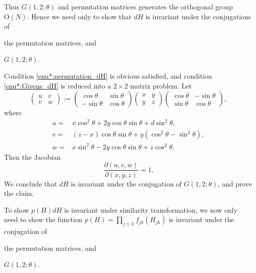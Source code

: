 \documentclass[11pt, a4paper]{article}
\numberwithin{equation}{section}
\newcommand{\Orthogonal}{\mathrm{O}}
\theoremstyle{definition}
\theoremstyle{remark}
\begin{document}
Thus $G(1, 2; \theta)$ and permutation matrices generates the orthogonal group $\Orthogonal(N)$. Hence we need only to show that $dH$ is invariant under the conjugations of
\begin{enumerate*}[label=(\alph*)]
\item \label{enu*:permutation_dH}
  the permutation matrices, and
\item \label{enu*:Givens_dH}
  $G(1, 2; \theta)$.
\end{enumerate*}
Condition \ref{enu*:permutation_dH} is obvious satisfied, and condition \ref{enu*:Givens_dH} is reduced into a $2 \times 2$ matrix problem. Let
\begin{equation}
  \begin{pmatrix}
    u & v \\
    v & w
  \end{pmatrix}
  :=
  \begin{pmatrix}
    \cos \theta & \sin \theta \\
    -\sin \theta & \cos \theta
  \end{pmatrix}
  \begin{pmatrix}
    x & y \\
    y & z
  \end{pmatrix}
  \begin{pmatrix}
    \cos \theta & -\sin \theta \\
    \sin \theta & \cos \theta
  \end{pmatrix},
  \end{equation}
where
\begin{align}
  u = {}& x \cos^2 \theta + 2y \cos \theta \sin \theta + d \sin^2 \theta, \label{eq:u_on_xyz} \\
  v = {}& (z - x) \cos \theta \sin \theta + y (\cos^2 \theta - \sin^2 \theta), \\
  w = {}& x \sin^2 \theta - 2y \cos \theta \sin \theta + z \cos^2 \theta. \label{eq:w_on_xyz} 
\end{align}
Then the Jacobian
\begin{equation}
  \frac{\partial(u, v, w)}{\partial(x, y, z)} = 1.
\end{equation}
We conclude that $dH$ is invariant under the conjugation of $G(1, 2; \theta)$, and prove the claim.

To show $p(H) dH$ is invariant under similarity transformation, we now only need to show the function $p(H) = \prod_{j \leq k} f_{jk}(H_{jk})$ is invariant under the conjugation of 
\begin{enumerate*}[label=(\alph*)]
\item \label{enu*:permutation_p(H)}
  the permutation matrices, and
\item \label{enu*:Givens_p(H)}
  $G(1, 2; \theta)$.
\end{enumerate*}
\end{document}
